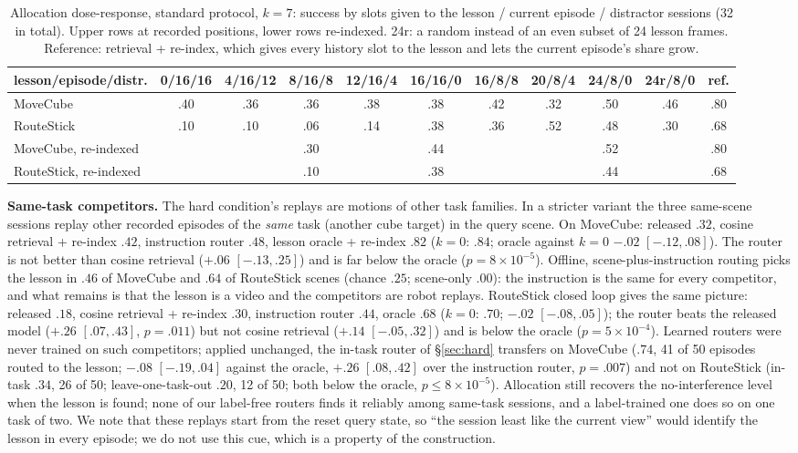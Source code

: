 \begin{table}[h]
\centering\small
\caption{Allocation dose-response, standard protocol, $k{=}7$: success by slots given to the lesson / current episode / distractor sessions (32 in total). Upper rows at recorded positions, lower rows re-indexed. 24r: a random instead of an even subset of 24 lesson frames. Reference: retrieval + re-index, which gives every history slot to the lesson and lets the current episode's share grow.}
\label{tab:dose}
\setlength{\tabcolsep}{3pt}
\begin{tabular}{lccccccccc|c}
\toprule
lesson/episode/distr. & 0/16/16 & 4/16/12 & 8/16/8 & 12/16/4 & 16/16/0 & 16/8/8 & 20/8/4 & 24/8/0 & 24r/8/0 & ref.\\
\midrule
MoveCube & .40 & .36 & .36 & .38 & .38 & .42 & .32 & .50 & .46 & .80\\
RouteStick & .10 & .10 & .06 & .14 & .38 & .36 & .52 & .48 & .30 & .68\\
\midrule
MoveCube, re-indexed & & & .30 & & .44 & & & .52 & & .80\\
RouteStick, re-indexed & & & .10 & & .38 & & & .44 & & .68\\
\bottomrule
\end{tabular}
\end{table}

\textbf{Same-task competitors.} The hard condition's replays are motions of other task families. In a stricter variant the three same-scene sessions replay other recorded episodes of the \emph{same} task (another cube target) in the query scene. On MoveCube: released $.32$, cosine retrieval + re-index $.42$, instruction router $.48$, lesson oracle + re-index $.82$ ($k{=}0$: $.84$; oracle against $k{=}0$ $-.02$ $[-.12,.08]$). The router is not better than cosine retrieval ($+.06$ $[-.13,.25]$) and is far below the oracle ($p=8\times10^{-5}$). Offline, scene-plus-instruction routing picks the lesson in $.46$ of MoveCube and $.64$ of RouteStick scenes (chance $.25$; scene-only $.00$): the instruction is the same for every competitor, and what remains is that the lesson is a video and the competitors are robot replays. RouteStick closed loop gives the same picture: released $.18$, cosine retrieval + re-index $.30$, instruction router $.44$, oracle $.68$ ($k{=}0$: $.70$; $-.02$ $[-.08,.05]$); the router beats the released model ($+.26$ $[.07,.43]$, $p=.011$) but not cosine retrieval ($+.14$ $[-.05,.32]$) and is below the oracle ($p=5\times10^{-4}$). Learned routers were never trained on such competitors; applied unchanged, the in-task router of \S\ref{sec:hard} transfers on MoveCube ($.74$, 41 of 50 episodes routed to the lesson; $-.08$ $[-.19,.04]$ against the oracle, $+.26$ $[.08,.42]$ over the instruction router, $p=.007$) and not on RouteStick (in-task $.34$, 26 of 50; leave-one-task-out $.20$, 12 of 50; both below the oracle, $p\le8\times10^{-5}$). Allocation still recovers the no-interference level when the lesson is found; none of our label-free routers finds it reliably among same-task sessions, and a label-trained one does so on one task of two. We note that these replays start from the reset query state, so ``the session least like the current view'' would identify the lesson in every episode; we do not use this cue, which is a property of the construction.

